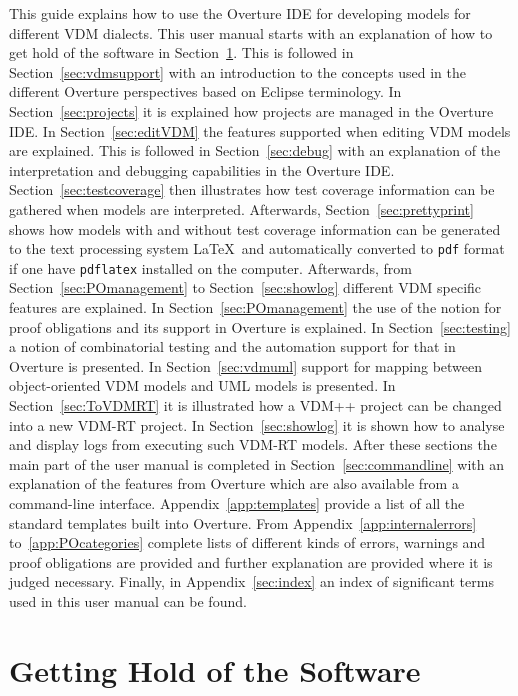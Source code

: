 \documentclass{overturerep}
\begin{document}
{This guide explains how to use the Overture IDE for developing models
for different VDM dialects. This user manual starts with an explanation
of how to get hold of the software in
Section~\ref{sec:install}. This is followed in
Section~\ref{sec:vdmsupport} with an introduction to the concepts used
in the different Overture perspectives based on Eclipse
terminology. In Section~\ref{sec:projects} it is explained how
projects are managed in the Overture IDE. In Section~\ref{sec:editVDM}
the features supported when editing VDM models are explained. This is
followed in Section~\ref{sec:debug} with an explanation of the
interpretation and debugging capabilities in the Overture
IDE. Section~\ref{sec:testcoverage} then illustrates how test coverage
information can be gathered when models are interpreted. Afterwards,
Section~\ref{sec:prettyprint} shows how models with and without test
coverage information can be generated to the text processing system
\LaTeX\ and automatically converted to \texttt{pdf} format if one have
\texttt{pdflatex} installed on the computer. Afterwards, from
Section~\ref{sec:POmanagement} to Section~\ref{sec:showlog} different
VDM specific features are explained. In Section~\ref{sec:POmanagement}
the use of the notion for proof obligations and its support in
Overture is explained. In Section~\ref{sec:testing} a notion of
combinatorial testing and the automation support for that in Overture
is presented. In Section~\ref{sec:vdmuml} support for mapping between
object-oriented VDM models and UML models is presented. In
Section~\ref{sec:ToVDMRT} it is illustrated how a VDM++ project can be 
changed into a new VDM-RT project. In Section~\ref{sec:showlog} it
is shown how to analyse and display logs from executing
such VDM-RT models. After these sections the main part of the user
manual is completed in Section~\ref{sec:commandline} with an
explanation of the features from Overture which are also available from
a command-line interface. Appendix~\ref{app:templates} provide a list
of all the standard templates built into Overture. 
From Appendix~\ref{app:internalerrors}
to~\ref{app:POcategories} complete lists of different kinds of errors,
warnings and proof obligations are provided and further explanation
are provided where it is judged necessary.
Finally, in
Appendix~\ref{sec:index} an index of significant terms used in this
user manual can be found. 


\section{Getting Hold of the Software}\label{sec:install}

}
\end{document}
